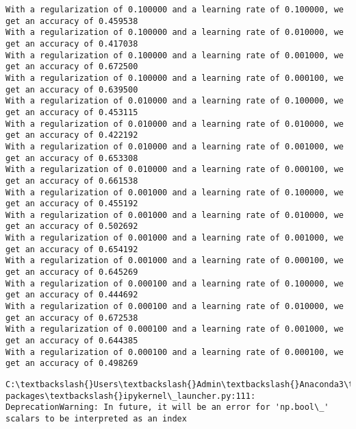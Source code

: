 \documentclass[11pt]{article}
\begin{document}
    \begin{Verbatim}[commandchars=\\\{\}]
With a regularization of 0.100000 and a learning rate of 0.100000, we get an accuracy of 0.459538
With a regularization of 0.100000 and a learning rate of 0.010000, we get an accuracy of 0.417038
With a regularization of 0.100000 and a learning rate of 0.001000, we get an accuracy of 0.672500
With a regularization of 0.100000 and a learning rate of 0.000100, we get an accuracy of 0.639500
With a regularization of 0.010000 and a learning rate of 0.100000, we get an accuracy of 0.453115
With a regularization of 0.010000 and a learning rate of 0.010000, we get an accuracy of 0.422192
With a regularization of 0.010000 and a learning rate of 0.001000, we get an accuracy of 0.653308
With a regularization of 0.010000 and a learning rate of 0.000100, we get an accuracy of 0.661538
With a regularization of 0.001000 and a learning rate of 0.100000, we get an accuracy of 0.455192
With a regularization of 0.001000 and a learning rate of 0.010000, we get an accuracy of 0.502692
With a regularization of 0.001000 and a learning rate of 0.001000, we get an accuracy of 0.654192
With a regularization of 0.001000 and a learning rate of 0.000100, we get an accuracy of 0.645269
With a regularization of 0.000100 and a learning rate of 0.100000, we get an accuracy of 0.444692
With a regularization of 0.000100 and a learning rate of 0.010000, we get an accuracy of 0.672538
With a regularization of 0.000100 and a learning rate of 0.001000, we get an accuracy of 0.644385
With a regularization of 0.000100 and a learning rate of 0.000100, we get an accuracy of 0.498269

    \end{Verbatim}

    \begin{Verbatim}[commandchars=\\\{\}]
C:\textbackslash{}Users\textbackslash{}Admin\textbackslash{}Anaconda3\textbackslash{}lib\textbackslash{}site-packages\textbackslash{}ipykernel\_launcher.py:111: DeprecationWarning: In future, it will be an error for 'np.bool\_' scalars to be interpreted as an index

    \end{Verbatim}

    \begin{center}
    \end{center}
    { \hspace*{\fill} \\}
    
\end{document}
